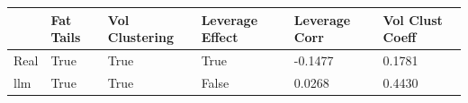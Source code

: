 \begin{tabular}{llllll}
\toprule
 & Fat Tails & Vol Clustering & Leverage Effect & Leverage Corr & Vol Clust Coeff \\
\midrule
Real & True & True & True & -0.1477 & 0.1781 \\
llm & True & True & False & 0.0268 & 0.4430 \\
\bottomrule
\end{tabular}
